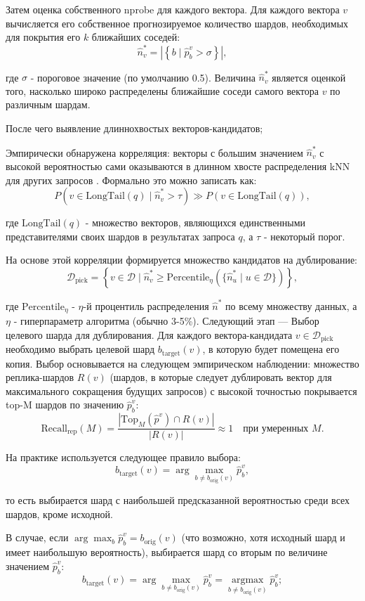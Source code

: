 Затем оценка собственного nprobe для каждого вектора. Для каждого вектора $v$ вычисляется его собственное прогнозируемое количество шардов, необходимых для покрытия его $k$ ближайших соседей:
$$
\hat{n}^*_v = \left|\left\{ b \mid \hat{p}^v_b > \sigma \right\}\right|,
$$

где $\sigma$ - пороговое значение (по умолчанию 0.5). Величина $\hat{n}^*_v$ является оценкой того, насколько широко распределены ближайшие соседи самого вектора $v$ по различным шардам.

После чего выявление длиннохвостых векторов-кандидатов;

Эмпирически обнаружена корреляция: векторы с большим значением $\hat{n}^*_v$ с высокой вероятностью сами оказываются в длинном хвосте распределения kNN для других запросов \cite{Lyra}. Формально это можно записать как:
$$
P\left(v \in \text{LongTail}(q) \mid \hat{n}^*_v > \tau \right) \gg P\left(v \in \text{LongTail}(q)\right),
$$

где $\text{LongTail}(q)$ - множество векторов, являющихся единственными представителями своих шардов в результатах запроса $q$, а $\tau$ - некоторый порог.

На основе этой корреляции формируется множество кандидатов на дублирование:
$$
\mathcal{D}_{\text{pick}} = \left\{ v \in \mathcal{D} \mid \hat{n}^*_v \geq \text{Percentile}_{\eta}(\{\hat{n}^*_u \mid u \in \mathcal{D}\}) \right\},
$$

где $\text{Percentile}_{\eta}$ - $\eta$-й процентиль распределения $\hat{n}^*$ по всему множеству данных, а $\eta$ - гиперпараметр алгоритма (обычно 3-5\%).
Следующий этап --- Выбор целевого шарда для дублирования. Для каждого вектора-кандидата $v \in \mathcal{D}_{\text{pick}}$ необходимо выбрать целевой шард $b_{\text{target}}(v)$, в которую будет помещена его копия. Выбор основывается на следующем эмпирическом наблюдении: множество реплика-шардов $R(v)$ (шардов, в которые следует дублировать вектор для максимального сокращения будущих запросов) с высокой точностью покрывается top-M шардов по значению $\hat{p}^v_b$:
$$
\text{Recall}_{\text{rep}}(M) = \frac{| \text{Top}_M(\hat{p}^v) \cap R(v) |}{|R(v)|} \approx 1 \quad \text{при умеренных } M.
$$

На практике используется следующее правило выбора:
$$
b_{\text{target}}(v) = \arg\max_{b \neq b_{\text{orig}}(v)} \hat{p}^v_b,
$$

то есть выбирается шард с наибольшей предсказанной вероятностью среди всех шардов, кроме исходной.

В случае, если $\arg\max_{b} \hat{p}^v_b = b_{\text{orig}}(v)$ (что возможно, хотя исходный шард и имеет наибольшую вероятность), выбирается шард со вторым по величине значением $\hat{p}^v_b$:
$$
b_{\text{target}}(v) = \arg\max_{b \neq b_{\text{orig}}(v)} \hat{p}^v_b = \underset{b \neq b_{\text{orig}}(v)}{\operatorname{argmax}} \hat{p}^v_b;
$$

